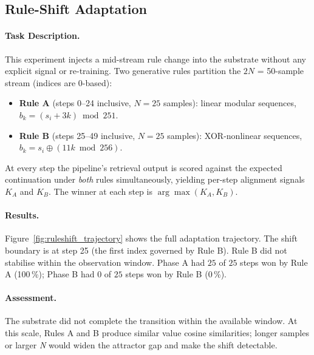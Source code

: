 \subsection{Rule-Shift Adaptation}
\label{sec:rule_shift}

\paragraph{Task Description.}
This experiment injects a mid-stream rule change into the substrate without
any explicit signal or re-training.  Two generative rules partition the
$2N$ = 50-sample stream (indices are 0-based):

\begin{itemize}[nosep]
  \item \textbf{Rule A} (steps 0--24 inclusive, $N=25$ samples):
        linear modular sequences, $b_k = (s_i + 3k) \bmod 251$.
  \item \textbf{Rule B} (steps 25--49 inclusive, $N=25$ samples):
        XOR-nonlinear sequences, $b_k = s_i \oplus (11k \bmod 256)$.
\end{itemize}

At every step the pipeline's retrieval output is scored against the
expected continuation under \emph{both} rules simultaneously, yielding
per-step alignment signals $K_A$ and $K_B$.  The winner at each step
is $\arg\max(K_A, K_B)$.

\paragraph{Results.}
Figure~\ref{fig:ruleshift_trajectory} shows the full adaptation
trajectory.  The shift boundary is at step 25 (the first index governed by Rule B).  Rule B
did not stabilise within the observation window.  Phase A had $25$ of
$25$ steps won by Rule A
(100\,\%); Phase B had $0$ of
$25$ steps won by Rule B (0\,\%).

\paragraph{Assessment.}
The substrate did not complete the transition within the available window.
At this scale, Rules A and B produce similar value cosine similarities;
longer samples or larger \textit{N} would widen the attractor gap and make
the shift detectable.
